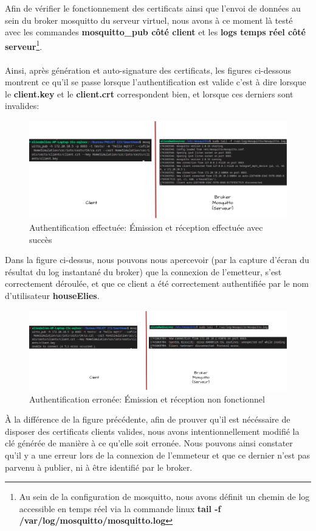 \documentclass[10pt, a4paper]{report}
\begin{document}
	Afin de vérifier le fonctionnement des certificats ainsi que l'envoi de données au sein du broker mosquitto du serveur virtuel, nous avons à ce moment là testé avec les commandes \textbf{mosquitto\_pub côté client} et les \textbf{logs temps réel côté serveur}\footnote{Au sein de la configuration de mosquitto, nous avons définit un chemin de log accessible en temps réel via la commande linux \textbf{tail -f /var/log/mosquitto/mosquitto.log}}.\\\\ Ainsi, après génération et auto-signature des certificats, les figures ci-dessous montrent ce qu'il se passe lorsque l'authentification est valide c'est à dire lorsque le \textbf{client.key} et le \textbf{client.crt} correspondent bien, et lorsque ces derniers sont invalides:
	
	\begin{figure}[h!]
		\centering
		\includegraphics[width=1\textwidth]{ressources/img/preuves/emissionReceptionMosquittoValide.drawio}
		\caption{Authentification effectuée: Émission et réception effectuée avec succès}
		\label{fig:mosquittoValide}
	\end{figure}
	
	Dans la figure ci-dessus, nous pouvons nous apercevoir (par la capture d'écran du résultat du log instantané du broker) que la connexion de l'emetteur, s'est correctement déroulée, et que ce client a été correctement authentifiée par le nom d'utilisateur \textbf{houseElies}. \newpage
	
	\begin{figure}[h!]
		\centering
		\includegraphics[width=1\textwidth]{ressources/img/preuves/emissionReceptionMosquittoInvalide.drawio}
		\caption{Authentification erronée: Émission et réception non fonctionnel}
		\label{fig:mosquittoInvalide}
	\end{figure}
	À la différence de la figure précédente, afin de prouver qu'il est nécéssaire de disposer des certificats clients valides, nous avons intentionnellement modifié la clé générée de manière à ce qu'elle soit erronée. Nous pouvons ainsi constater qu'il y a une erreur lors de la connexion de l'emmeteur et que ce dernier n'est pas parvenu à publier, ni à être identifié par le broker.
	
\end{document}
